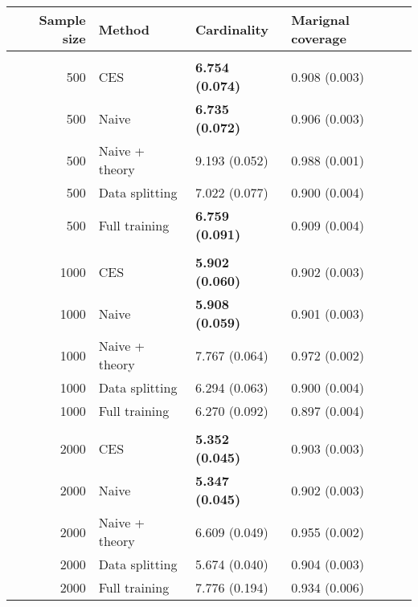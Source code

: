 
\begin{tabular}[t]{rlll}
\toprule
Sample size & Method & Cardinality & Marignal coverage\\
\midrule
\addlinespace[0.3em]
\multicolumn{4}{l}{\textbf{500}}\\
\hspace{1em}500 & CES & \textbf{6.754 (0.074)} & 0.908 (0.003)\\
\hspace{1em}500 & Naive & \textbf{6.735 (0.072)} & 0.906 (0.003)\\
\hspace{1em}500 & Naive + theory & 9.193 (0.052) & 0.988 (0.001)\\
\hspace{1em}500 & Data splitting & 7.022 (0.077) & 0.900 (0.004)\\
\hspace{1em}500 & Full training & \textbf{6.759 (0.091)} & 0.909 (0.004)\\
\addlinespace[0.3em]
\multicolumn{4}{l}{\textbf{1000}}\\
\hspace{1em}1000 & CES & \textbf{5.902 (0.060)} & 0.902 (0.003)\\
\hspace{1em}1000 & Naive & \textbf{5.908 (0.059)} & 0.901 (0.003)\\
\hspace{1em}1000 & Naive + theory & 7.767 (0.064) & 0.972 (0.002)\\
\hspace{1em}1000 & Data splitting & 6.294 (0.063) & 0.900 (0.004)\\
\hspace{1em}1000 & Full training & 6.270 (0.092) & 0.897 (0.004)\\
\addlinespace[0.3em]
\multicolumn{4}{l}{\textbf{2000}}\\
\hspace{1em}2000 & CES & \textbf{5.352 (0.045)} & 0.903 (0.003)\\
\hspace{1em}2000 & Naive & \textbf{5.347 (0.045)} & 0.902 (0.003)\\
\hspace{1em}2000 & Naive + theory & 6.609 (0.049) & 0.955 (0.002)\\
\hspace{1em}2000 & Data splitting & 5.674 (0.040) & 0.904 (0.003)\\
\hspace{1em}2000 & Full training & 7.776 (0.194) & 0.934 (0.006)\\
\bottomrule
\end{tabular}
